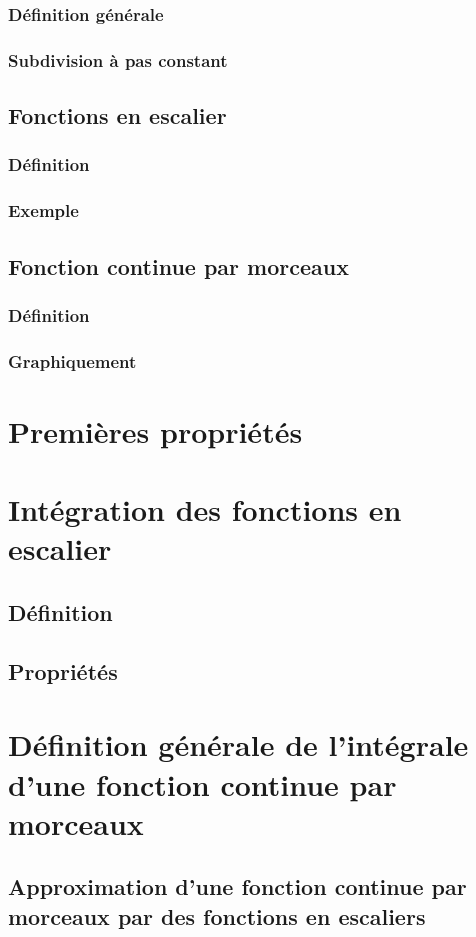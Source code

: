 \documentclass[12pt,a4paper,french]{book}
\begin{document}
			\subsubsection{Définition générale}
			\subsubsection{Subdivision à pas constant}
		\subsection{Fonctions en escalier}
			\subsubsection{Définition}
			\subsubsection{Exemple}
		\subsection{Fonction continue par morceaux}
			\subsubsection{Définition}
			\subsubsection{Graphiquement}
	\section{Premières propriétés}
	\section{Intégration des fonctions en escalier}
		\subsection{Définition}
		\subsection{Propriétés}
	\section{Définition générale de l'intégrale d'une fonction continue par morceaux}
		\subsection{Approximation d'une fonction continue par morceaux par des fonctions en escaliers}
\end{document}

